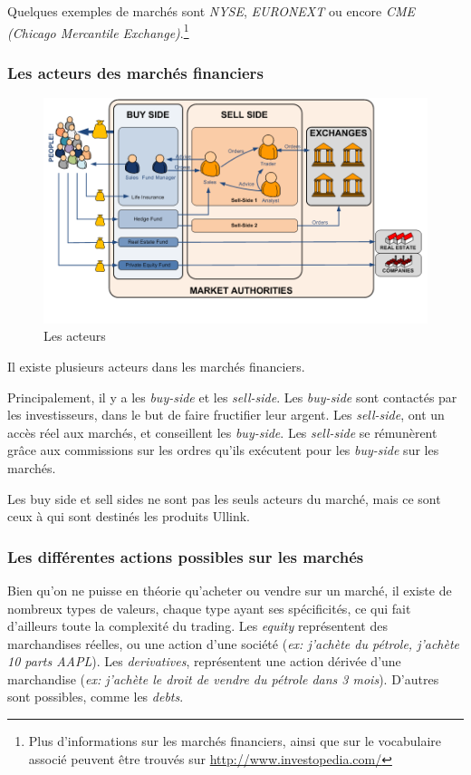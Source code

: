 \documentclass[a4paper, 12pt]{article}
\begin{document}
Quelques exemples de marchés sont \emph{NYSE}, \emph{EURONEXT} ou encore \emph{CME (Chicago Mercantile Exchange)}.\footnote{Plus d'informations sur les marchés financiers, ainsi que sur le vocabulaire associé peuvent être trouvés sur \url{http://www.investopedia.com/}}

\subsubsection{Les acteurs des marchés financiers}

\begin{figure}
\includegraphics[width=\textwidth]{market_actors.png}
\caption{Les acteurs}
\label{market_actors}
\end{figure}

Il existe plusieurs acteurs dans les marchés financiers.

Principalement, il y a les \emph{buy-side} et les \emph{sell-side}. Les \emph{buy-side} sont contactés par les investisseurs, dans le but de faire fructifier leur argent. Les \emph{sell-side}, ont  un accès réel aux marchés, et conseillent les \emph{buy-side}. Les \emph{sell-side} se rémunèrent grâce aux commissions sur les ordres qu'ils exécutent pour les \emph{buy-side} sur les marchés.

Les buy side et sell sides ne sont pas les seuls acteurs du marché, mais ce sont ceux à qui sont destinés les produits Ullink.


\subsubsection{Les différentes actions possibles sur les marchés}

Bien qu'on ne puisse en théorie qu'acheter ou vendre sur un marché, il existe de nombreux types de valeurs, chaque type ayant ses spécificités, ce qui fait d'ailleurs toute la complexité du trading. Les \emph{equity} représentent des marchandises réelles, ou une action d'une société (\emph{ex: j'achète du pétrole, j'achète 10 parts AAPL}). Les \emph{derivatives}, représentent une action dérivée d'une marchandise (\emph{ex: j'achète le droit de vendre du pétrole dans 3 mois}). D'autres sont possibles, comme les \emph{debts}.
\end{document}
